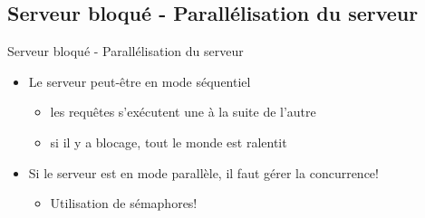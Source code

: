 \begin{frame}{\sectitle}
    \def\subsectitle{Serveur bloqué - Parallélisation du serveur}
    \subsection{\subsectitle}
    \begin{block}{\subsectitle}
        \begin{itemize}
            \item Le serveur peut-être en mode séquentiel
                \begin{itemize}
                    \item les requêtes s'exécutent une à la suite de l'autre
                    \item si il y a blocage, tout le monde est ralentit
                \end{itemize}
            \item Si le serveur est en mode parallèle, il faut gérer la
                concurrence!
                \begin{itemize}
                    \item Utilisation de sémaphores!
                \end{itemize}
        \end{itemize}
    \end{block}
\end{frame}

